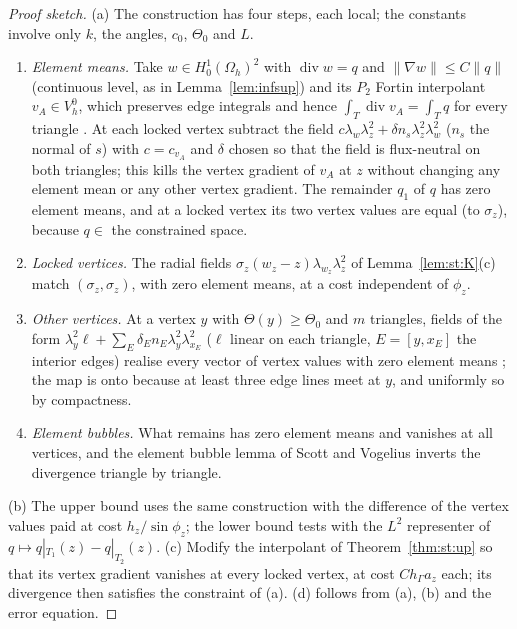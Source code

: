 \documentclass[pdflatex,sn-mathphys-num]{sn-jnl}
\theoremstyle{thmstyleone}
\theoremstyle{thmstylethree}
\newcommand{\hG}{h_\Gamma}
\newcommand{\Oh}{\Omega_h}
\newcommand{\VO}{V_h^0}
\newcommand{\norm}[1]{\lVert #1\rVert}
\renewcommand{\div}{\operatorname{div}}
\begin{document}
\begin{proof}[Proof sketch]
(a) The construction has four steps, each local; the constants involve only $k$, the angles, $c_0$, $\Theta_0$ and $L$.
\begin{enumerate}[label=\Alph*.]
\item \emph{Element means.} Take $w\in H^1_0(\Oh)^2$ with $\div w=q$ and $\norm{\nabla w}\le C\norm q$ (continuous level, as in Lemma~\ref{lem:infsup}) and its $P_2$ Fortin interpolant $v_A\in\VO$, which preserves edge integrals and hence $\int_T\div v_A=\int_Tq$ for every triangle \cite{GiraultRaviart}. At each locked vertex subtract the field $c\lambda_w\lambda_z^2+\delta n_s\lambda_z^2\lambda_w^2$ ($n_s$ the normal of $s$) with $c=c_{v_A}$ and $\delta$ chosen so that the field is flux-neutral on both triangles; this kills the vertex gradient of $v_A$ at $z$ without changing any element mean or any other vertex gradient. The remainder $q_1$ of $q$ has zero element means, and at a locked vertex its two vertex values are equal (to $\sigma_z$), because $q\in$ the constrained space.
\item \emph{Locked vertices.} The radial fields $\sigma_z(w_z-z)\lambda_{w_z}\lambda_z^2$ of Lemma~\ref{lem:st:K}(c) match $(\sigma_z,\sigma_z)$, with zero element means, at a cost independent of $\phi_z$.
\item \emph{Other vertices.} At a vertex $y$ with $\Theta(y)\ge\Theta_0$ and $m$ triangles, fields of the form $\lambda_y^2\ell+\sum_E\delta_En_E\lambda_y^2\lambda_{x_E}^2$ ($\ell$ linear on each triangle, $E=[y,x_E]$ the interior edges) realise every vector of vertex values with zero element means \cite{GuzmanScott2019,PadhiExt}; the map is onto because at least three edge lines meet at $y$, and uniformly so by compactness.
\item \emph{Element bubbles.} What remains has zero element means and vanishes at all vertices, and the element bubble lemma of Scott and Vogelius \cite{ScottVogelius1985} inverts the divergence triangle by triangle.
\end{enumerate} (b) The upper bound uses the same construction with the difference of the vertex values paid at cost $h_z/\sin\phi_z$; the lower bound tests with the $L^2$ representer of $q\mapsto q|_{T_1}(z)-q|_{T_2}(z)$. (c) Modify the interpolant of Theorem~\ref{thm:st:up} so that its vertex gradient vanishes at every locked vertex, at cost $C\hG a_z$ each; its divergence then satisfies the constraint of (a). (d) follows from (a), (b) and the error equation.
\end{proof}
\end{document}
